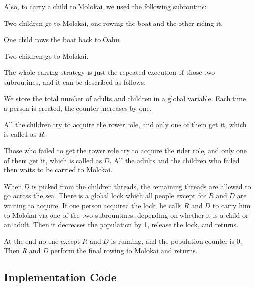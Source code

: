 \documentclass{article}
\begin{document}
\begin{spacing}{1.1}
Also, to carry a child to Molokai, we used the following subroutine:
\begin{asparaitem}
  \item Two children go to Molokai, one rowing the boat and the other riding it.\\
  \item One child rows the boat back to Oahu.\\
  \item Two children go to Molokai.\\
\end{asparaitem}

The whole carring strategy is just the repeated execution of those two subroutines, and it can be described as follows:

\begin{asparaitem}
  \item We store the total number of adults and children in a global variable. Each time a person is created, the counter increases by one.\\
  \item All the children try to acquire the rower role, and only one of them get it, which is called as $R$.\\
  \item Those who failed to get the rower role try to acquire the rider role, and only one of them get it, which is  called as $D$. All the adults and the children who failed then waits to be carried to Molokai.\\
  \item When $D$ is picked from the children threads, the remaining threads are allowed to go across the sea. There is a global lock which all people except for $R$ and $D$ are waiting to acquire. If one person acquired the lock, he calls $R$ and $D$ to carry him to Molokai via one of the two subrountines, depending on whether it is a child or an adult. Then it decreases the population by 1, release the lock, and returns.\\
  \item At the end no one except $R$ and $D$ is running, and the population counter is 0. Then $R$ and $D$ perform the final rowing to Molokai and returns.
\end{asparaitem}

\subsection{Implementation Code}

\end{spacing}
\end{document}
